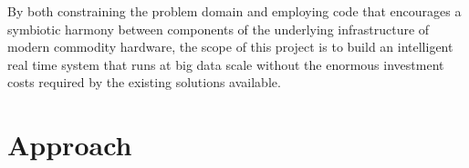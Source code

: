 \documentclass[a4paper,11pt]{scrreprt}
\begin{document}
By both constraining the problem domain and employing code that encourages a symbiotic harmony between components of the underlying infrastructure of modern commodity hardware, the scope of this project is to build an intelligent real time system that runs at big data scale without the enormous investment costs required by the existing solutions available.

\chapter{Approach}


\printbibliography
\end{document}
